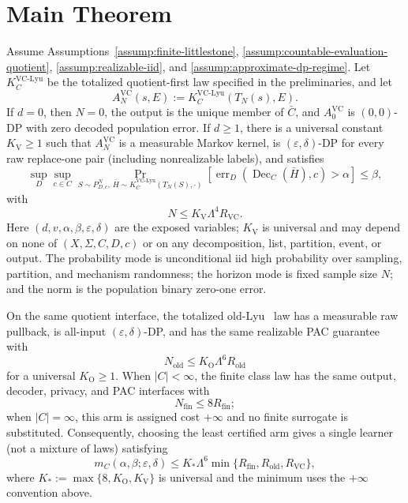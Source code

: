 \section{Main Theorem}

\begin{theorem}\label{thm:main}
Assume Assumptions~\ref{assump:finite-littlestone},
\ref{assump:countable-evaluation-quotient},
\ref{assump:realizable-iid}, and
\ref{assump:approximate-dp-regime}.  Let $K_C^{\mathrm{VC\text{-}Lyu}}$
be the totalized quotient-first law specified in the preliminaries, and let
\[
 A_N^{\mathrm{VC}}(s,E):=K_C^{\mathrm{VC\text{-}Lyu}}(T_N(s),E).
\]
If $d=0$, then $N=0$, the output is the unique member of $\bar C$, and
$A_0^{\mathrm{VC}}$ is $(0,0)$-DP with zero decoded population error.  If
$d\ge1$, there is a universal constant $K_{\mathrm V}\ge1$ such that
$A_N^{\mathrm{VC}}$ is a measurable
Markov kernel, is $(\varepsilon,\delta)$-DP for every raw replace-one pair
(including nonrealizable labels), and satisfies
\[
 \sup_D\sup_{c\in C}
 \Pr_{S\sim P_{D,c}^{N},\,\bar H\sim K_C^{\mathrm{VC\text{-}Lyu}}(T_N(S),\cdot)}
 \left[\operatorname{err}_D(\operatorname{Dec}_C(\bar H),c)>\alpha\right]
 \le\beta,
\]
with
\[
 N\le K_{\mathrm V}\Lambda^{4}R_{\mathrm{VC}}.
\]
Here $(d,v,\alpha,\beta,\varepsilon,\delta)$ are the exposed variables;
$K_{\mathrm V}$ is universal and may depend on none of
$(X,\Sigma,C,D,c)$ or on any decomposition, list, partition, event, or
output.  The probability mode is unconditional iid high probability over
sampling, partition, and mechanism randomness; the horizon mode is fixed
sample size $N$; and the norm is the population binary zero-one error.

On the same quotient interface, the totalized old-Lyu~\citep{lyu2025} law has a measurable
raw pullback, is all-input $(\varepsilon,\delta)$-DP, and has the same
realizable PAC guarantee with
\[
 N_{\mathrm{old}}\le K_{\mathrm O}\Lambda^{6}R_{\mathrm{old}}
\]
for a universal $K_{\mathrm O}\ge1$.  When $|C|<\infty$, the finite
class law has the same output, decoder, privacy, and PAC interfaces with
\[
 N_{\mathrm{fin}}\le 8R_{\mathrm{fin}};
\]
when $|C|=\infty$, this arm is assigned cost $+\infty$ and no finite
surrogate is substituted.  Consequently, choosing the least certified arm
gives a single learner (not a mixture of laws) satisfying
\[
 m_C(\alpha,\beta;\varepsilon,\delta)
 \le K_*\Lambda^{6}\min\{R_{\mathrm{fin}},R_{\mathrm{old}},R_{\mathrm{VC}}\},
\]
where $K_*:=\max\{8,K_{\mathrm O},K_{\mathrm V}\}$ is universal and the minimum uses the
$+\infty$ convention above.
\end{theorem}

